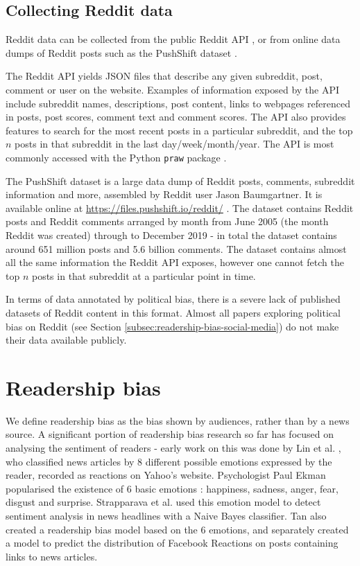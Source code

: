 \subsection{Collecting Reddit data} \label{subsec:collecting-reddit-data}

Reddit data can be collected from the public Reddit API \cite{reddit-api}, or from online data dumps of Reddit posts such as the PushShift dataset \cite{pushshift}.

The Reddit API yields JSON files that describe any given subreddit, post, comment or user on the website. Examples of information exposed by the API include subreddit names, descriptions, post content, links to webpages referenced in posts, post scores, comment text and comment scores. The API also provides features to search for the most recent posts in a particular subreddit, and the top $ n $ posts in that subreddit in the last day/week/month/year. The API is most commonly accessed with the Python \texttt{praw} package \cite{praw}.

The PushShift dataset is a large data dump of Reddit posts, comments, subreddit information and more, assembled by Reddit user Jason Baumgartner. It is available online at \url{https://files.pushshift.io/reddit/} \cite{pushshift}. The dataset contains Reddit posts and Reddit comments arranged by month from June 2005 (the month Reddit was created) through to December 2019 - in total the dataset contains around 651 million posts and 5.6 billion comments. The dataset contains almost all the same information the Reddit API exposes, however one cannot fetch the top $ n $ posts in that subreddit at a particular point in time.

In terms of data annotated by political bias, there is a severe lack of published datasets of Reddit content in this format. Almost all papers exploring political bias on Reddit (see Section \ref{subsec:readership-bias-social-media}) do not make their data available publicly.

\section{Readership bias} \label{sec:readership-bias}

We define readership bias as the bias shown by audiences, rather than by a news source. A significant portion of readership bias research so far has focused on analysing the sentiment of readers - early work on this was done by Lin et al. \cite{lin}, who classified news articles by 8 different possible emotions expressed by the reader, recorded as reactions on Yahoo's website. Psychologist Paul Ekman popularised the existence of 6 basic emotions \cite{ekman}: happiness, sadness, anger, fear, disgust and surprise. Strapparava et al. \cite{strapparava} used this emotion model to detect sentiment analysis in news headlines with a Naive Bayes classifier. Tan \cite{chien-tan} also created a readership bias model based on the 6 emotions, and separately created a model to predict the distribution of Facebook Reactions on posts containing links to news articles.

